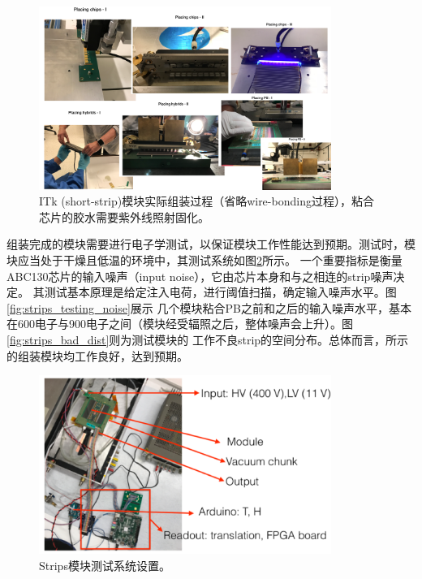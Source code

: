 \begin{figure}[h]
\centering
 \includegraphics[width=0.85\textwidth]{fig/strips_module_assembly.png}
 \caption{ITk (short-strip)模块实际组装过程（省略wire-bonding过程），粘合芯片的胶水需要紫外线照射固化。}
 \label{fig:strip_moduel_assembly}
\end{figure}
组装完成的模块需要进行电子学测试，以保证模块工作性能达到预期。测试时，模块应当处于干燥且低温的环境中，其测试系统如图\ref{fig:strips_testing_setup}所示。
一个重要指标是衡量ABC130芯片的输入噪声（input noise），它由芯片本身和与之相连的strip噪声决定。
其测试基本原理是给定注入电荷，进行阈值扫描，确定输入噪声水平。图\ref{fig:strips_testing_noise}展示
几个模块粘合PB之前和之后的输入噪声水平，基本在600电子与900电子之间（模块经受辐照之后，整体噪声会上升）。图\ref{fig:strips_bad_dist}则为测试模块的
工作不良strip的空间分布。总体而言，所示的组装模块均工作良好，达到预期。
\begin{figure}[h]
\centering
 \includegraphics[width=0.85\textwidth]{fig/strips_module_setup.png}
 \caption{Strips模块测试系统设置。}
 \label{fig:strips_testing_setup}
\end{figure}
